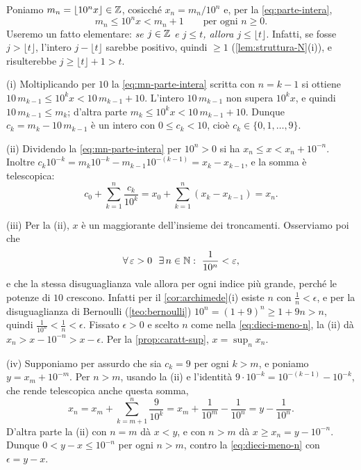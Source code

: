 \begin{dimostrazione}
Poniamo $m_{n}=\lfloor10^{n}x\rfloor\in\mathbb{Z}$, cosicché $x_{n}=m_{n}/10^{n}$ e, per la
\eqref{eq:parte-intera},
\begin{equation}\label{eq:mn-parte-intera}
  m_{n}\le10^{n}x<m_{n}+1 \qquad\text{per ogni } n\ge0 .
\end{equation}
Useremo un fatto elementare: \emph{se $j\in\mathbb{Z}$ e $j\le t$, allora $j\le\lfloor t\rfloor$}.
Infatti, se fosse $j>\lfloor t\rfloor$, l'intero $j-\lfloor t\rfloor$ sarebbe positivo,
quindi $\ge1$ (\cref{lem:struttura-N}(i)), e risulterebbe $j\ge\lfloor t\rfloor+1>t$.

(i) Moltiplicando per $10$ la \eqref{eq:mn-parte-intera} scritta con $n=k-1$ si ottiene
$10\,m_{k-1}\le10^{k}x<10\,m_{k-1}+10$. L'intero $10\,m_{k-1}$ non supera $10^{k}x$, e
quindi $10\,m_{k-1}\le m_{k}$; d'altra parte $m_{k}\le10^{k}x<10\,m_{k-1}+10$. Dunque
$c_{k}=m_{k}-10\,m_{k-1}$ è un intero con $0\le c_{k}<10$, cioè $c_{k}\in\{0,1,\dots,9\}$.

(ii) Dividendo la \eqref{eq:mn-parte-intera} per $10^{n}>0$ si ha
$x_{n}\le x<x_{n}+10^{-n}$. Inoltre $c_{k}10^{-k}=m_{k}10^{-k}-m_{k-1}10^{-(k-1)}
=x_{k}-x_{k-1}$, e la somma è telescopica:
\[
  c_{0}+\sum_{k=1}^{n}\frac{c_{k}}{10^{k}}=x_{0}+\sum_{k=1}^{n}(x_{k}-x_{k-1})=x_{n}.
\]

(iii) Per la (ii), $x$ è un maggiorante dell'insieme dei troncamenti. Osserviamo poi che
\begin{equation}\label{eq:dieci-meno-n}
  \perogni\epsilon>0\ \ \esiste n\in\N : \ \frac{1}{10^{n}}<\epsilon ,
\end{equation}
e che la stessa disuguaglianza vale allora per ogni indice più grande, perché le potenze
di $10$ crescono. Infatti per il \cref{cor:archimede}(i) esiste $n$ con $\frac1n<\epsilon$,
e per la disuguaglianza di Bernoulli (\cref{teo:bernoulli}) $10^{n}=(1+9)^{n}\ge1+9n>n$,
quindi $\frac{1}{10^{n}}<\frac1n<\epsilon$. Fissato $\epsilon>0$ e scelto $n$ come nella
\eqref{eq:dieci-meno-n}, la (ii) dà $x_{n}>x-10^{-n}>x-\epsilon$. Per la
\cref{prop:caratt-sup}, $x=\sup_{n}x_{n}$.

(iv) Supponiamo per assurdo che sia $c_{k}=9$ per ogni $k>m$, e poniamo $y=x_{m}+10^{-m}$.
Per $n>m$, usando la (ii) e l'identità $9\cdot10^{-k}=10^{-(k-1)}-10^{-k}$, che rende
telescopica anche questa somma,
\[
  x_{n}=x_{m}+\sum_{k=m+1}^{n}\frac{9}{10^{k}}=x_{m}+\frac{1}{10^{m}}-\frac{1}{10^{n}}
  =y-\frac{1}{10^{n}} .
\]
D'altra parte la (ii) con $n=m$ dà $x<y$, e con $n>m$ dà $x\ge x_{n}=y-10^{-n}$. Dunque
$0<y-x\le10^{-n}$ per ogni $n>m$, contro la \eqref{eq:dieci-meno-n} con $\epsilon=y-x$.
\end{dimostrazione}

